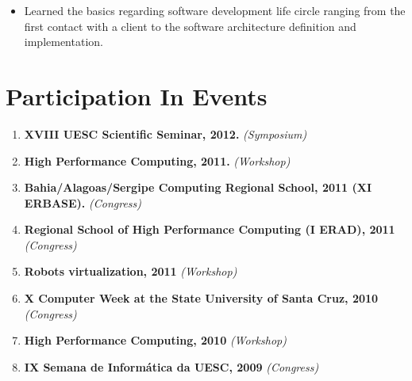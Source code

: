 \documentclass[10pt, a4paper, oneside, final]{scrartcl} %
\begin{document}
\begin{itemize}\itemsep1.5pt
\item Learned the basics regarding software development life circle ranging from the first contact with a client to the software architecture definition and implementation.
\end{itemize}


\section{Participation In Events}

\begin{enumerate}\itemsep1.5pt

\item \textbf{XVIII UESC Scientific Seminar, 2012.} \textit{(Symposium)}

\item \textbf{High Performance Computing, 2011.} \textit{(Workshop)}

\item \textbf{Bahia/Alagoas/Sergipe Computing Regional School, 2011 (XI ERBASE).}
 \textit{(Congress)}

\item \textbf{Regional School of High Performance Computing (I ERAD), 2011} \textit{(Congress)}

\item \textbf{Robots virtualization, 2011} \textit{(Workshop)}

\item \textbf{X Computer Week at the State University of Santa Cruz, 2010} \textit{(Congress)}

\item \textbf{High Performance Computing, 2010} \textit{(Workshop)}

\item \textbf{IX Semana de Informática da UESC, 2009} \textit{(Congress)}


\end{enumerate}

\end{document}
